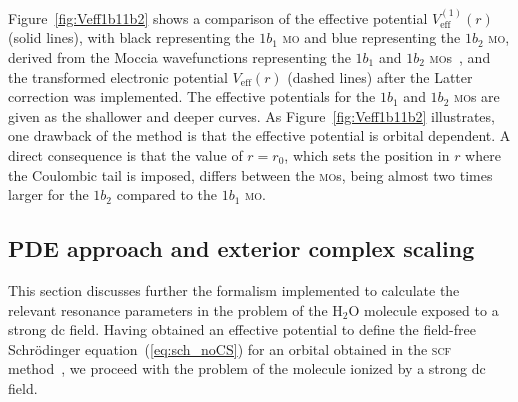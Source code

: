 Figure~\ref{fig:Veff1b11b2} shows a comparison of the effective
potential $V_{\mathrm{eff}}^{(1)}(r)$ (solid lines), with black
representing the $1b_{1}$ \textsc{mo} and blue representing the
$1b_{2}$ \textsc{mo}, derived from the Moccia wavefunctions
representing the $1b_{1}$ and $1b_{2}$
\textsc{mo}s~\cite{Moccia_1964}, and the transformed electronic
potential $V_{\mathrm{eff}}(r)$ (dashed lines) after the Latter
correction was implemented. The effective potentials for the $1b_{1}$
and $1b_{2}$ \textsc{mo}s are given as the shallower and deeper
curves. As Figure~\ref{fig:Veff1b11b2} illustrates, one drawback of
the method is that the effective potential is orbital dependent. A
direct consequence is that the value of $r=r_{0}$, which sets the
position in $r$ where the Coulombic tail is imposed, differs between
the \textsc{mo}s, being almost two times larger for the $1b_{2}$
compared to the $1b_{1}$ \textsc{mo}.


\subsection{PDE approach and exterior complex scaling}
\label{ch:ecs_1b11b2}

This section discusses further the formalism implemented to calculate
the relevant resonance parameters in the problem of the H$_{2}$O
molecule exposed to a strong dc field. Having obtained an effective
potential to define the field-free Schr\"{o}dinger
equation~(\ref{eq:sch_noCS}) for an orbital obtained in the
\textsc{scf} method~\cite{Moccia_1964}, we proceed with the problem of
the molecule ionized by a strong dc field.

